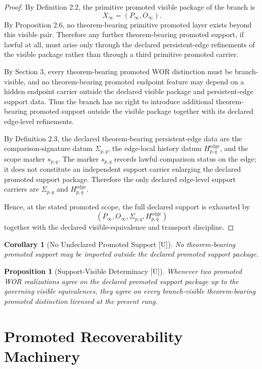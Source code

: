 \documentclass[11pt]{article}
\newtheorem{proposition}[theorem]{Proposition}
\newtheorem{corollary}[theorem]{Corollary}
\theoremstyle{definition}
\theoremstyle{remark}
\newcommand{\U}{\textnormal{[U]}}
\newcommand{\Pinf}{P_\infty}
\newcommand{\Oinf}{O_\infty}
\newcommand{\Xinf}{X_\infty}
\newcommand{\Sigmaedge}{\Sigma_{p,q}}
\newcommand{\Hedge}{H^{\mathrm{edge}}_{p,q}}
\newcommand{\scopepq}{s_{p,q}}
\begin{document}
\begin{proof}
By Definition 2.2, the primitive promoted visible package of the branch is
\[
\Xinf=(\Pinf,\Oinf).
\]
By Proposition 2.6, no theorem-bearing primitive promoted layer exists beyond this visible pair. Therefore any further theorem-bearing promoted support, if lawful at all, must arise only through the declared persistent-edge refinements of the visible package rather than through a third primitive promoted carrier.

By Section 3, every theorem-bearing promoted WOR distinction must be branch-visible, and no theorem-bearing promoted endpoint feature may depend on a hidden endpoint carrier outside the declared visible package and persistent-edge support data. Thus the branch has no right to introduce additional theorem-bearing promoted support outside the visible package together with its declared edge-level refinements.

By Definition 2.3, the declared theorem-bearing persistent-edge data are the comparison-signature datum \(\Sigmaedge\), the edge-local history datum \(\Hedge\), and the scope marker \(\scopepq\). The marker \(\scopepq\) records lawful comparison status on the edge; it does not constitute an independent support carrier enlarging the declared promoted support package. Therefore the only declared edge-level support carriers are \(\Sigmaedge\) and \(\Hedge\).

Hence, at the stated promoted scope, the full declared support is exhausted by
\[
(\Pinf,\Oinf,\Sigmaedge,\Hedge)
\]
together with the declared visible-equivalence and transport discipline. \qedhere
\end{proof}

\begin{corollary}[No Undeclared Promoted Support {\U}]
No theorem-bearing promoted support may be imported outside the declared promoted support package.
\end{corollary}

\begin{proposition}[Support-Visible Determinacy {\U}]
Whenever two promoted WOR realizations agree on the declared promoted support package up to the governing visible equivalences, they agree on every branch-visible theorem-bearing promoted distinction licensed at the present rung.
\end{proposition}

\section{Promoted Recoverability Machinery}
\end{document}

